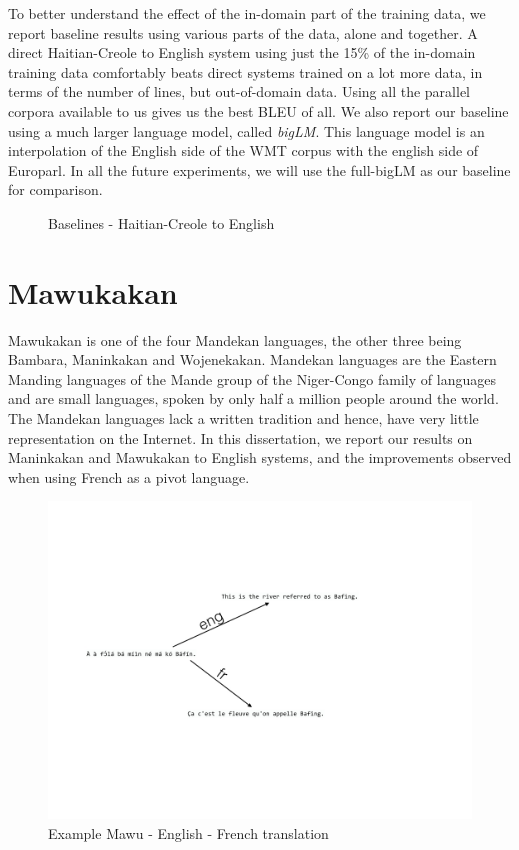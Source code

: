 To better understand the effect of the in-domain part of the training data, we report baseline results using various parts of the data, alone and together. A direct Haitian-Creole to English system using just the 15\% of the in-domain training data comfortably beats direct systems trained on a lot more data, in terms of the number of lines, but out-of-domain data. Using all the parallel corpora available to us gives us the best BLEU of all. We also report our baseline using a much larger language model, called \emph{bigLM}. This language model is an interpolation of the English side of the WMT corpus with the english side of Europarl. In all the future experiments, we will use the full-bigLM as our baseline for comparison. 

\begin{figure}[ht]
	\small
	\centering
	
	\label{fig:haiti_baselines}
	\caption{Baselines - Haitian-Creole to English}
\end{figure}

\section{Mawukakan}
	Mawukakan is one of the four Mandekan languages, the other three being Bambara, Maninkakan and Wojenekakan. Mandekan languages are the Eastern Manding languages of the Mande group of the Niger-Congo family of languages and are small languages, spoken by only half a million people around the world. The Mandekan languages lack a written tradition and hence, have very little representation on the Internet. In this dissertation, we report our results on Maninkakan and Mawukakan to English systems, and the improvements observed when using French as a pivot language. 
	\begin{figure}[ht]
		\small
		\centering
		\includegraphics[trim=4cm 1cm 2cm 3cm, clip=true, height=0.6\textheight]{files/Figures/mawu.jpg}
		\caption{Example Mawu - English - French translation}
		\label{fig:mawu_example}
	\end{figure}
	
